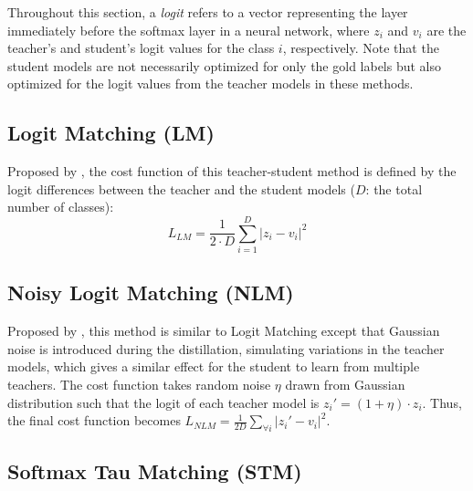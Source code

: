 \documentclass{article}
\begin{document}
Throughout this section, a \textit{logit} refers to a vector representing the layer immediately before the softmax layer in a neural network, where $z_i$ and  $v_i$ are the teacher's and student's logit values for the class $i$, respectively.
Note that the student models are not necessarily optimized for only the gold labels but also optimized for the logit values from the teacher models in these methods.
















\subsection{Logit Matching (LM)}
\label{ssec:logit}

Proposed by \cite{ba2014deep}, the cost function of this teacher-student method is defined by the logit differences between the teacher and the student models ($D$: the total number of classes):\vspace{-2.5ex}
$$L_{LM} = \frac{1}{2\cdot D}\sum_{i=1}^D|z_i-v_i |^2$$


\subsection{Noisy Logit Matching (NLM)}
\label{ssec:nlogit}

Proposed by \cite{sau2016deep}, this method is similar to Logit Matching except that Gaussian noise is introduced during the distillation, simulating variations in the teacher models, 
which gives a similar effect for the student to learn from multiple teachers.
The cost function takes random noise $\eta$ drawn from Gaussian distribution such that the logit of each teacher model is $z_{i}' = (1+\eta)\cdot z_{i}$.
Thus, the final cost function becomes $L_{NLM} = \frac{1}{2D}\sum_{\forall i}|z_i'-v_i |^2$.


\subsection{Softmax Tau Matching (STM)}
\label{ssec:stm}
\end{document}
